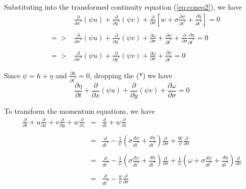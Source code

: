 \documentclass[oribibl]{llncs}
\begin{document}
Substituting into the transformed continuity equation (\ref{eq:coneq2}), we have
\begin{eqnarray}\label{eq:coneq3}
&&\frac{\partial}{\partial x^*}(\psi u) +\frac{\partial}{\partial y^*}(\psi v) + \frac{\partial}{\partial \sigma} \left[w+ \sigma \frac{\partial \psi}{\partial t^*} + \frac{\partial \eta}{\partial t^*} \right] = 0 \nonumber \\ \nonumber \\  
&=>& \frac{\partial}{\partial x^*}(\psi u) +\frac{\partial}{\partial y^*}(\psi v) + \frac{\partial \omega}{\partial \sigma} +\frac{\partial \psi}{\partial t^*} + \frac{\partial}{\partial \sigma} \frac{\partial \eta}{\partial t^*} = 0  \nonumber \\ \nonumber \\ 
&=>& \frac{\partial}{\partial x^*}(\psi u) +\frac{\partial}{\partial y^*}(\psi v) + \frac{\partial \omega}{\partial \sigma} +\frac{\partial \psi}{\partial t^*} = 0
\end{eqnarray}

Since $\psi=h+\eta$ and $\frac{\partial h}{\partial t^*}=0$,  dropping the (*)  we have
\begin{equation}\label{eq:coneq4}
\frac{\partial \eta}{\partial t}+\frac{\partial}{\partial x}(\psi u) +\frac{\partial}{\partial y}(\psi v) + \frac{\partial \omega}{\partial \sigma}= 0 
\end{equation}

To transform the momentum equations, we have
\begin{eqnarray}
\frac{\partial}{\partial t}+u\frac{\partial}{\partial x} + v\frac{\partial}{\partial y}+w\frac{\partial}{\partial z} &=& \frac{d}{dt}+w\frac{\partial}{\partial z} \nonumber \\ \nonumber \\ 
&=&\frac{d}{dt^*} -\frac{1}{\psi}\left( \sigma \frac{d\psi}{dt^*} +\frac{d\eta}{dt^*}   \right) \frac{\partial}{\partial \sigma} + \frac{W}{\psi}\frac{\partial}{\partial \sigma}  \nonumber \\ \nonumber \\ 
&=&\frac{d}{dt^*} -\frac{1}{\psi}\left( \sigma \frac{d\psi}{dt^*} +\frac{d\eta}{dt^*}   \right) \frac{\partial}{\partial \sigma}  +\frac{1}{\psi}\left( \omega+ \sigma \frac{d\psi}{dt^*} +\frac{d\eta}{dt^*} \right) \frac{\partial}{\partial \sigma}  \nonumber \\ \nonumber \\ 
&=&\frac{d}{dt^*} - \frac{w}{\psi} \frac{\partial}{\partial \sigma}
\end{eqnarray}
\end{document}
